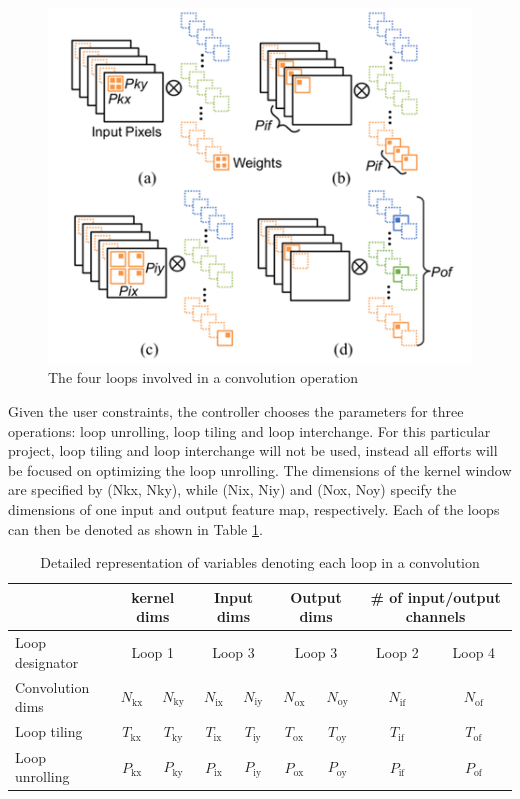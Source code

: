 \documentclass{uw-ece-wkrpt}
\begin{document}
\begin{figure}
\centering
\includegraphics{figures/four_loops}
\caption{The four loops involved in a convolution operation \cite{Ma2017Optimizing-Loop}}\label{fig:four_loops}
\end{figure}

Given the user constraints, the controller chooses the parameters for three operations: loop unrolling, loop tiling and loop interchange. For this particular project, loop tiling and loop interchange will not be used, instead all efforts will be focused on optimizing the loop unrolling. The dimensions of the \gls{kernel} window are specified by (Nkx, Nky), while (Nix, Niy) and (Nox, Noy) specify the dimensions of one input and output feature map, respectively. Each of the loops can then be denoted as shown in Table \ref{tab:loop_vars}.

\begin{table}[hbp]
\centering
\caption{Detailed representation of variables denoting each loop in a convolution \cite{Ma2017Optimizing-Loop}}\label{tab:loop_vars}
\begin{tabular}{l cc cc cc c c}
\toprule
& \multicolumn{2}{c}{\Gls{kernel} dims} & \multicolumn{2}{c}{Input dims} & \multicolumn{2}{c}{Output dims} & \multicolumn{2}{c}{\# of input/output channels} \\
\midrule
Loop designator & \multicolumn{2}{c}{Loop 1} & \multicolumn{2}{c}{Loop 3} & \multicolumn{2}{c}{Loop 3} & Loop 2 & Loop 4 \\
Convolution dims & $N_\mathrm{kx}$ & $N_\mathrm{ky}$ & $N_\mathrm{ix}$ & $N_\mathrm{iy}$ & $N_\mathrm{ox}$ & $N_\mathrm{oy}$ & $N_\mathrm{if}$ & $N_\mathrm{of}$ \\
Loop tiling & $T_\mathrm{kx}$ & $T_\mathrm{ky}$ & $T_\mathrm{ix}$ & $T_\mathrm{iy}$ & $T_\mathrm{ox}$ & $T_\mathrm{oy}$ & $T_\mathrm{if}$ & $T_\mathrm{of}$ \\
Loop unrolling & $P_\mathrm{kx}$ & $P_\mathrm{ky}$ & $P_\mathrm{ix}$ & $P_\mathrm{iy}$ & $P_\mathrm{ox}$ & $P_\mathrm{oy}$ & $P_\mathrm{if}$ & $P_\mathrm{of}$ \\
\bottomrule
\end{tabular}
\end{table}
\end{document}
